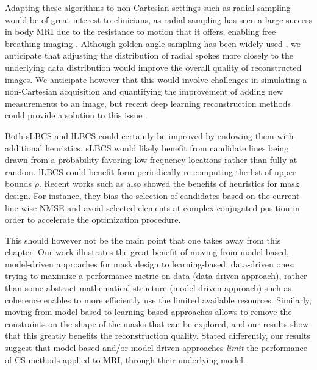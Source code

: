     Adapting these algorithms to non-Cartesian settings such as radial sampling would be of great interest to clinicians, as radial sampling has seen a large success in body MRI due to the resistance to motion that it offers, enabling free breathing imaging \citep{coppo2015free,feng2016xd}. Although golden angle sampling has been widely used \citep{feng2014golden}, we anticipate that adjusting the distribution of radial spokes more closely to the underlying data distribution would improve the overall quality of reconstructed images. We anticipate however that this would involve challenges in simulating a non-Cartesian acquisition and quantifying the improvement of adding new measurements to an image, but recent deep learning reconstruction methods could provide a solution to this issue \citep{ramzi2022nc}.


    Both sLBCS and lLBCS could certainly be improved by endowing them with additional heuristics. sLBCS would likely benefit from candidate lines being drawn from a probability favoring low frequency locations rather than fully at random. lLBCS could benefit form periodically re-computing the list of upper bounds $\rho$. Recent works such as \citet{zibetti2020fast} also showed the benefits of heuristics for mask design. For instance, they bias the selection of candidates based on the current line-wise NMSE and avoid selected elements at complex-conjugated position in order to accelerate the optimization procedure.

    This should however not be the main point that one takes away from this chapter. Our work illustrates the great benefit of moving from model-based, model-driven approaches for mask design to learning-based, data-driven ones: trying to maximize a performance metric on data (data-driven approach), rather than some abstract mathematical structure (model-driven approach) such as coherence enables to more efficiently use the limited available resources. Similarly, moving from model-based to learning-based approaches allows to remove the constraints on the shape of the masks that can be explored, and our results show that this greatly benefits the reconstruction quality. Stated differently, our results suggest that model-based and/or model-driven approaches \textit{limit} the performance of CS methods applied to MRI, through their underlying model. 

